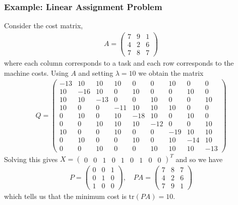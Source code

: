 \documentclass{article}
\begin{document}
\subsubsection{Example: Linear Assignment Problem}

Consider the cost matrix, \begin{align*}
    A = \begin{pmatrix}
        7 & 9 & 1\\
        4 & 2 & 6\\
        7 & 8 & 7
    \end{pmatrix}
\end{align*}
where each column corresponds to a task and each row corresponds to the machine costs. Using \(A\) and setting \(\lambda = 10\) we obtain the matrix
\begin{align*}
    Q = \begin{pmatrix}
        -13 & 10 & 10 & 10 & 0 & 0 & 10 & 0 & 0 \\
        10 & -16 & 10 & 0 & 10 & 0 & 0 & 10 & 0 \\
        10 & 10 & -13 & 0 & 0 & 10 & 0 & 0 & 10 \\
        10 & 0 & 0 & -11 & 10 & 10 & 10 & 0 & 0 \\
        0 & 10 & 0 & 10 & -18 & 10 & 0 & 10 & 0 \\
        0 & 0 & 10 & 10 & 10 & -12 & 0 & 0 & 10 \\
        10 & 0 & 0 & 10 & 0 & 0 & -19 & 10 & 10 \\
        0 & 10 & 0 & 0 & 10 & 0 & 10 & -14 & 10 \\
        0 & 0 & 10 & 0 & 0 & 10 & 10 & 10 & -13
    \end{pmatrix}
\end{align*}
Solving this gives \(X = \begin{pmatrix}
    0 & 0 & 1 & 0 & 1 & 0 & 1 & 0 & 0
\end{pmatrix}^T\)
and so we have \begin{align*}
    P = \begin{pmatrix}
        0 & 0 & 1 \\
        0 & 1 & 0 \\
        1 & 0 & 0
    \end{pmatrix}, \quad PA = \begin{pmatrix}
        7 & 8 & 7 \\
        4 & 2 & 6 \\
        7 & 9 & 1
    \end{pmatrix}
\end{align*}
which tells us that the minimum cost is \(\text{tr}(PA) = 10\).
\end{document}
